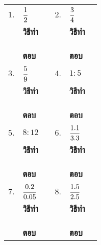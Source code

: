 \documentclass[
  a4paper,
  DIV=11,
  numbers=noendperiod]{scrartcl}
\begin{document}
\renewcommand{\arraystretch}{2.2}

\begin{longtable*}[l]{llp{5.5cm}|llp{5.5cm}}

1.  & $\cfrac{1}{2}$   &           & 2.  & $\cfrac{3}{4}$   & \\
    & \textbf{วิธีทำ}  &  \dotfill &     & \textbf{วิธีทำ}  & \dotfill\\
    &               &  \dotfill &     &                 & \dotfill\\ 
    &               &  \dotfill &     &                 & \dotfill\\ 
    &               &  \dotfill &     &                 & \dotfill\\ 
    & \textbf{ตอบ}  &  \dotfill &     & \textbf{ตอบ}  & \dotfill\\        

3.  & $\cfrac{5}{9}$   &           & 4.  & $1:5$   & \\
    & \textbf{วิธีทำ}  &  \dotfill &     & \textbf{วิธีทำ}  & \dotfill\\
    &               &  \dotfill &     &                 & \dotfill\\ 
    &               &  \dotfill &     &                 & \dotfill\\ 
    &               &  \dotfill &     &                 & \dotfill\\ 
    & \textbf{ตอบ}  &  \dotfill &     & \textbf{ตอบ}  & \dotfill\\  

\newpage

5.  & $8:12$   &           & 6.  & $\cfrac{1.1}{3.3}$   & \\
    & \textbf{วิธีทำ}  &  \dotfill &     & \textbf{วิธีทำ}  & \dotfill\\
    &               &  \dotfill &     &                 & \dotfill\\ 
    &               &  \dotfill &     &                 & \dotfill\\ 
    &               &  \dotfill &     &                 & \dotfill\\ 
    & \textbf{ตอบ}  &  \dotfill &     & \textbf{ตอบ}  & \dotfill\\      

7.  & $\cfrac{0.2}{0.05}$   &           & 8.  & $\cfrac{1.5}{2.5}$   & \\
    & \textbf{วิธีทำ}  &  \dotfill &     & \textbf{วิธีทำ}  & \dotfill\\
    &               &  \dotfill &     &                 & \dotfill\\ 
    &               &  \dotfill &     &                 & \dotfill\\ 
    &               &  \dotfill &     &                 & \dotfill\\ 
    & \textbf{ตอบ}  &  \dotfill &     & \textbf{ตอบ}  & \dotfill\\   


\end{longtable*}
\end{document}
